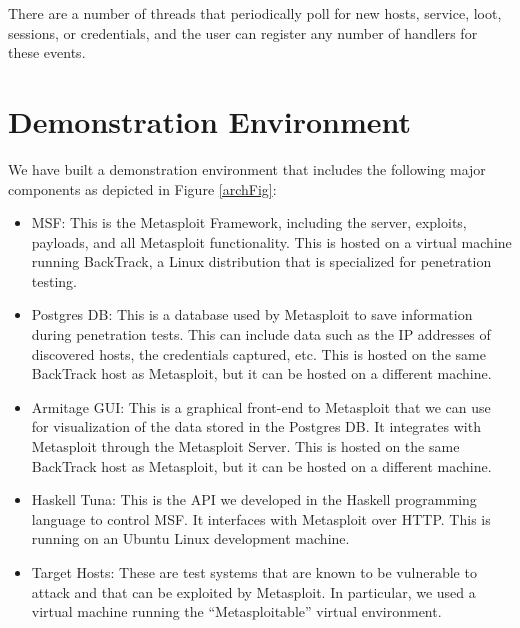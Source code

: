 \documentclass[figure,letterpaper,onefignum]{mysiam}
\begin{document}
There are a number of threads that periodically poll for new hosts, service, loot, sessions, or credentials, and the user can register any number of handlers for these events.


\section{Demonstration Environment}
We have built a demonstration environment that includes the following major components as depicted in Figure \ref{archFig}:
\begin{itemize}
  \item MSF: This is the Metasploit Framework, including the server, exploits, payloads, and all Metasploit functionality. This is hosted on a virtual machine running BackTrack, a Linux distribution that is specialized for penetration testing.
  \item Postgres DB: This is a database used by Metasploit to save information during penetration tests. This can include data such as the IP addresses of discovered hosts, the credentials captured, etc. This is hosted on the same BackTrack host as Metasploit, but it can be hosted on a different machine.
  \item Armitage GUI: This is a graphical front-end to Metasploit that we can use for visualization of the data stored in the Postgres DB. It integrates with Metasploit through the Metasploit Server. This is hosted on the same BackTrack host as Metasploit, but it can be hosted on a different machine.
  \item Haskell Tuna: This is the API we developed in the Haskell programming language to control MSF. It interfaces with Metasploit over HTTP. This is running on an Ubuntu Linux development machine.
  \item Target Hosts: These are test systems that are known to be vulnerable to attack and that can be exploited by Metasploit. In particular, we used a virtual machine running the ``Metasploitable'' virtual environment.
\end{itemize}
\end{document}
